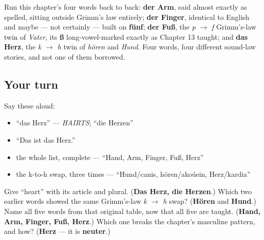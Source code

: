 \begin{grammarlens}[title={Grammar Lens: the whole chapter, run once more}]
Run this chapter's four words back to back: \textbf{der Arm}, said almost exactly as spelled, sitting outside Grimm's law entirely; \textbf{der Finger}, identical to English and maybe — not certainly — built on \textbf{fünf}; \textbf{der Fuß}, the \emph{p $\to$ f} Grimm's-law twin of \emph{Vater}, its \textbf{ß} long-vowel-marked exactly as Chapter 13 taught; and \textbf{das Herz}, the \emph{k $\to$ h} twin of \emph{hören} and \emph{Hund}. Four words, four different sound-law stories, and not one of them borrowed.
\end{grammarlens}

\subsection*{Your turn}
Say these aloud:

\begin{itemize}
\raggedright
  \item \textquotedblleft{}das Herz\textquotedblright{} — \emph{HAIRTS}; \textquotedblleft{}die Herzen\textquotedblright{}
  \item \textquotedblleft{}Das ist das Herz.\textquotedblright{}
  \item the whole list, complete — \textquotedblleft{}Hand, Arm, Finger, Fuß, Herz\textquotedblright{}
  \item the k-to-h swap, three times — \textquotedblleft{}Hund/canis, hören/akoúein, Herz/kardia\textquotedblright{}
\end{itemize}

\begin{tcolorbox}[breakable,colback=teal!4,colframe=teal!35!black,title={Before you move on}]
Give \textquotedblleft{}heart\textquotedblright{} with its article and plural. (\textbf{Das Herz, die Herzen}.) Which two earlier words showed the same Grimm's-law \emph{k $\to$ h} swap? (\textbf{Hören} and \textbf{Hund}.) Name all five words from that original table, now that all five are taught. (\textbf{Hand, Arm, Finger, Fuß, Herz}.) Which one breaks the chapter's masculine pattern, and how? (\textbf{Herz} — it is \textbf{neuter}.)
\end{tcolorbox}
